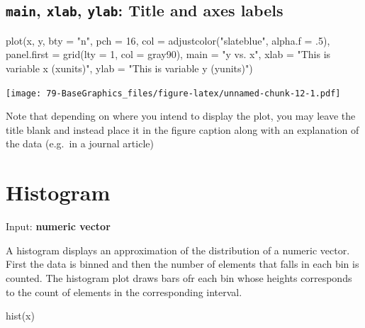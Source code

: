 \documentclass[
]{book}
\newenvironment{Shaded}{\begin{snugshade}}{\end{snugshade}}
\newcommand{\AttributeTok}[1]{\textcolor[rgb]{0.77,0.63,0.00}{#1}}
\newcommand{\DecValTok}[1]{\textcolor[rgb]{0.00,0.00,0.81}{#1}}
\newcommand{\FunctionTok}[1]{\textcolor[rgb]{0.00,0.00,0.00}{#1}}
\newcommand{\NormalTok}[1]{#1}
\newcommand{\StringTok}[1]{\textcolor[rgb]{0.31,0.60,0.02}{#1}}
\begin{document}
\hypertarget{main-xlab-ylab-title-and-axes-labels}{%
\subsection{\texorpdfstring{\textbf{\texttt{main}}, \textbf{\texttt{xlab}}, \textbf{\texttt{ylab}}: Title and axes labels}{main, xlab, ylab: Title and axes labels}}\label{main-xlab-ylab-title-and-axes-labels}}

\begin{Shaded}
\begin{Highlighting}[]
\FunctionTok{plot}\NormalTok{(x, y,}
     \AttributeTok{bty =} \StringTok{"n"}\NormalTok{, }\AttributeTok{pch =} \DecValTok{16}\NormalTok{,}
     \AttributeTok{col =} \FunctionTok{adjustcolor}\NormalTok{(}\StringTok{"slateblue"}\NormalTok{, }\AttributeTok{alpha.f =}\NormalTok{ .}\DecValTok{5}\NormalTok{),}
     \AttributeTok{panel.first =} \FunctionTok{grid}\NormalTok{(}\AttributeTok{lty =} \DecValTok{1}\NormalTok{, }\AttributeTok{col =} \StringTok{\textquotesingle{}gray90\textquotesingle{}}\NormalTok{),}
     \AttributeTok{main =} \StringTok{"y vs. x"}\NormalTok{,}
     \AttributeTok{xlab =} \StringTok{"This is variable x (xunits)"}\NormalTok{,}
     \AttributeTok{ylab =} \StringTok{"This is variable y (yunits)"}\NormalTok{)}
\end{Highlighting}
\end{Shaded}

\texttt{[image: 79-BaseGraphics\_files/figure-latex/unnamed-chunk-12-1.pdf]}

Note that depending on where you intend to display the plot, you may leave the title blank and instead place it in the figure caption along with an explanation of the data (e.g.~in a journal article)

\hypertarget{histogram}{%
\section{Histogram}\label{histogram}}

Input: \textbf{numeric vector}

A histogram displays an approximation of the distribution of a numeric vector. First the data is binned and then the number of elements that falls in each bin is counted. The histogram plot draws bars ofr each bin whose heights corresponds to the count of elements in the corresponding interval.

\begin{Shaded}
\begin{Highlighting}[]
\FunctionTok{hist}\NormalTok{(x)}
\end{Highlighting}
\end{Shaded}
\end{document}
